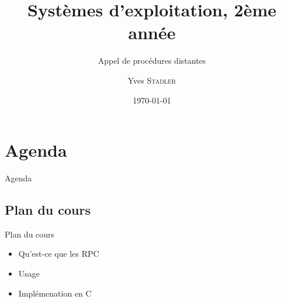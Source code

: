 \title{Systèmes d'exploitation, 2ème année}
\subtitle{Appel de procédures distantes}

\author{Yves \textsc{Stadler}}

\date{\today}



\begin{frame}
\titlepage
\end{frame}


\def\sectitle{Agenda}
\section{\sectitle}
\begin{frame}{\sectitle}
    \def\subsectitle{Plan du cours}
    \subsection{\subsectitle}
    \begin{block}{\subsectitle}
        \begin{itemize}
            \item Qu'est-ce que les RPC
            \item Usage
            \item Implémenation en C
        \end{itemize}
    \end{block}
\end{frame}


\def\sectitle{Principe des RPC}
